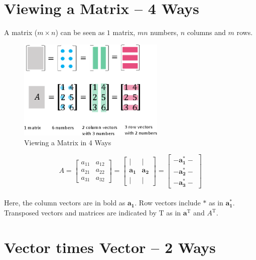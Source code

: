 \documentclass[letterpaper]{article}
\DeclareRobustCommand\transp{^{\mathrm{T}}}
\begin{document}
\tableofcontents

\section{Viewing a Matrix -- 4 Ways}

A matrix ($m \times n$) can be seen as $1$ matrix, $mn$ numbers, $n$ columns and $m$ rows.

\begin{figure}[H]
  \centering
  \includegraphics[keepaspectratio, width=7cm]{ViewingMatrix-4Ways.eps}
  \caption{Viewing a Matrix in 4 Ways}
\end{figure}


\begin{equation*}
  A= \begin{bmatrix}
    a_{11} & a_{12}\\
    a_{21} & a_{22}\\
    a_{31} & a_{32}
  \end{bmatrix}
  =
  \begin{bmatrix}
    | & |\\
    \bm{a_1} & \bm{a_2}\\
    | & |
  \end{bmatrix}
  =
  \begin{bmatrix}
    - \bm{a_1^*} -\\
    - \bm{a_2^*} -\\
    - \bm{a_3^*} -
  \end{bmatrix}
\end{equation*} \\

Here, the column vectors are in bold as $\bm{a_1}$.
Row vectors include $\bm{*}$ as in $\bm{a_1^*}$.
Transposed vectors and matrices are indicated by $\mathrm{T}$ as
in $\bm{a}\transp$ and $A\transp$.

\section{Vector times Vector -- 2 Ways}
\end{document}
